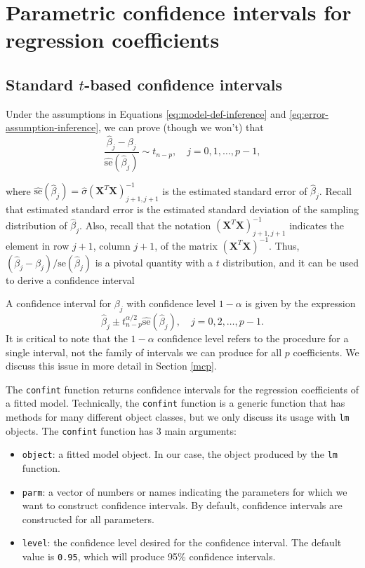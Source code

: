 \documentclass[
]{book}
\providecommand{\tightlist}{%
  \setlength{\itemsep}{0pt}\setlength{\parskip}{0pt}}
\theoremstyle{definition}
\theoremstyle{definition}
\theoremstyle{definition}
\theoremstyle{definition}
\theoremstyle{remark}
\begin{document}
\hypertarget{parametric-confidence-intervals-for-regression-coefficients}{%
\section{Parametric confidence intervals for regression coefficients}\label{parametric-confidence-intervals-for-regression-coefficients}}

\hypertarget{tci}{%
\subsection{\texorpdfstring{Standard \(t\)-based confidence intervals}{Standard t-based confidence intervals}}\label{tci}}

Under the assumptions in Equations \eqref{eq:model-def-inference} and
\eqref{eq:error-assumption-inference}, we can prove (though we won't)
that
\[
\frac{\hat{\beta}_j-\beta_j}{\hat{\mathrm{se}}(\hat{\beta}_j)}\sim t_{n-p}, \quad j=0,1,\ldots,p-1,
\]

where
\(\hat{\mathrm{se}}(\hat{\beta}_j)=\hat{\sigma}(\mathbf{X}^T\mathbf{X})^{-1}_{j+1,j+1}\)
is the estimated standard error of \(\hat{\beta}_j\). Recall that
estimated standard error is the estimated standard deviation of the
sampling distribution of \(\hat{\beta}_j\). Also, recall that the notation
\((\mathbf{X}^T\mathbf{X})^{-1}_{j+1,j+1}\) indicates the element in row
\(j+1\), column \(j+1\), of the matrix \((\mathbf{X}^T\mathbf{X})^{-1}\).
Thus, \((\hat{\beta}_j-\beta_j)/\hat{\mathrm{se}}(\hat{\beta}_j)\) is a
pivotal quantity with a \(t\) distribution, and it can be used to derive a
confidence interval

A confidence interval for \(\beta_j\) with confidence level \(1-\alpha\) is
given by the expression
\[
\hat{\beta}_j \pm t^{\alpha/2}_{n-p} \hat{\mathrm{se}}(\hat{\beta}_j),\quad j=0,2,\ldots,p-1.
\label{eq:t-ci-betas}
\]
It is critical to note that the \(1-\alpha\) confidence level refers to
the procedure for a single interval, not the family of intervals we can
produce for all \(p\) coefficients. We discuss this issue in more detail
in Section \ref{mcp}.

The \texttt{confint} function returns confidence intervals for the regression
coefficients of a fitted model. Technically, the \texttt{confint} function is a
generic function that has methods for many different object classes, but
we only discuss its usage with \texttt{lm} objects. The \texttt{confint} function has
3 main arguments:

\begin{itemize}
\tightlist
\item
  \texttt{object}: a fitted model object. In our case, the object produced by the \texttt{lm} function.
\item
  \texttt{parm}: a vector of numbers or names indicating the parameters for which we want to construct confidence intervals. By default, confidence intervals are constructed for all parameters.
\item
  \texttt{level}: the confidence level desired for the confidence interval. The default value is \texttt{0.95}, which will produce 95\% confidence intervals.
\end{itemize}
\end{document}
